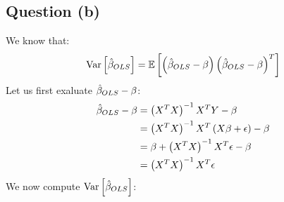 \documentclass[12pt]{article}
\begin{document}
\subsection{Question (b)}
We know that:
\begin{align*}
    \textrm{Var}\left[\hat \beta_{OLS}\right]
     & = \mathbb{E}\left[ \left(\hat \beta_{OLS} - \beta\right) \left(\hat \beta_{OLS} - \beta\right)^T \right] \\
\end{align*}
Let us first exaluate \(\hat \beta_{OLS} - \beta\):
\begin{align*}
    \hat \beta_{OLS} - \beta
     & = \left( X^T X \right)^{-1}X^T Y - \beta                              \\
     & = \left( X^T X \right)^{-1}X^T \left(X\beta + \epsilon\right) - \beta \\
     & = \beta + \left( X^T X \right)^{-1}X^T \epsilon - \beta               \\
     & = \left( X^T X \right)^{-1}X^T \epsilon                               \\
\end{align*}
We now compute \(\textrm{Var}\left[\hat \beta_{OLS}\right]\):
\end{document}
